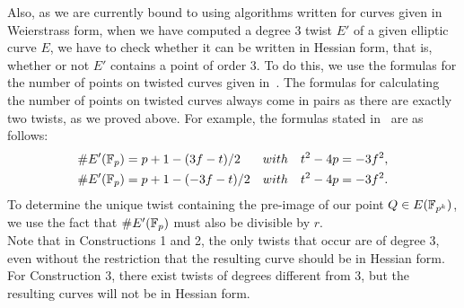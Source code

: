 
Also, as we are currently bound to using algorithms written for curves given in Weierstrass form, when we have computed a degree 3 twist $E'$ of a given elliptic curve $E$, we have to check whether it can be written in Hessian form, that is, whether or not $E'$ contains a point of order 3. To do this, we use the formulas for the number of points on twisted curves given in~\cite{2006/hess}.
The formulas for calculating the number of points on twisted curves always come in pairs as there are exactly two twists, as we proved above.
For example, the formulas stated in~\cite{2006/hess} are as follows:
\begin{align*}
\# E' (\mathbb{F}_{p}) &= p + 1 - (3f - t) / 2 & with & \quad t^2 - 4p = -3f^2, \\
\# E' (\mathbb{F}_{p}) &= p + 1 - (-3f- t) / 2 & with & \quad t^2 - 4p = -3f^2.
\end{align*}
To determine the unique twist containing the pre-image of our point $Q \in E(\mathbb{F}_{p^{k}})$,
we use the fact that $\#E'(\mathbb{F}_{p})$ must also be divisible by $r$.
\\
Note that in Constructions 1 and 2, the only twists that occur are of degree 3, even without the restriction that the resulting curve should be in Hessian form. For Construction 3, there exist twists of degrees different from 3, but the resulting curves will not be in Hessian form.

